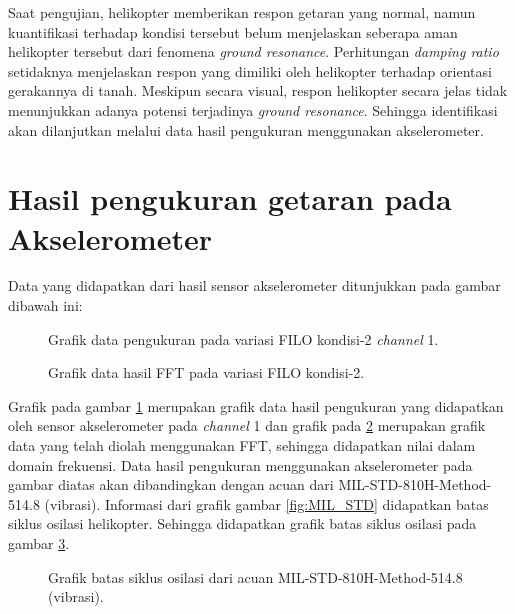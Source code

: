 Saat pengujian, helikopter memberikan respon getaran yang normal, namun kuantifikasi terhadap kondisi tersebut belum menjelaskan seberapa aman helikopter tersebut dari fenomena \textit{ground resonance}. Perhitungan \textit{damping ratio} setidaknya menjelaskan respon yang dimiliki oleh helikopter terhadap orientasi gerakannya di tanah. Meskipun secara visual, respon helikopter secara jelas tidak menunjukkan adanya potensi terjadinya \textit{ground resonance}. Sehingga identifikasi akan dilanjutkan melalui data hasil pengukuran menggunakan akselerometer.

\section{Hasil pengukuran getaran pada Akselerometer}

Data yang didapatkan dari hasil sensor akselerometer ditunjukkan pada gambar dibawah ini:

\begin{figure}[h]
	\centering
	\caption{Grafik data pengukuran pada variasi FILO kondisi-2 \textit{channel} 1.}
	\label{fig:raw_config2_FILO}
\end{figure}

\begin{figure}[H]
	\centering
	\caption{Grafik data hasil FFT pada variasi FILO kondisi-2.}
	\label{fig:fft_config2_FILO}
\end{figure}

Grafik pada gambar \ref{fig:raw_config2_FILO} merupakan grafik data hasil pengukuran yang didapatkan oleh sensor akselerometer pada \textit{channel} 1 dan grafik pada \ref{fig:fft_config2_FILO} merupakan grafik data yang telah diolah menggunakan FFT, sehingga didapatkan nilai dalam domain frekuensi. Data hasil pengukuran menggunakan akselerometer pada gambar diatas akan dibandingkan dengan acuan dari MIL-STD-810H-Method-514.8 (vibrasi). Informasi dari grafik gambar \ref{fig:MIL_STD} didapatkan batas siklus osilasi helikopter. Sehingga didapatkan grafik batas siklus osilasi pada gambar \ref{fig:batas_siklus}.

\begin{figure}[h]
	\centering
	\caption{Grafik batas siklus osilasi dari acuan MIL-STD-810H-Method-514.8 (vibrasi).}
	\label{fig:batas_siklus}
\end{figure}


